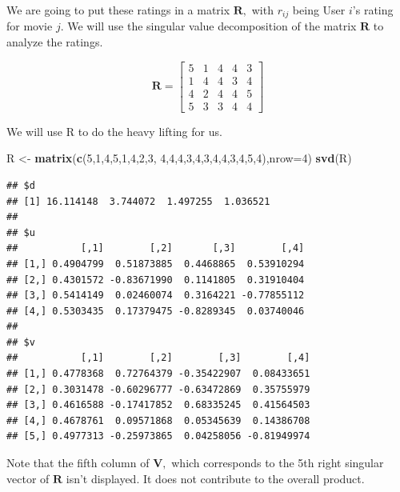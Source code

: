 \documentclass[
]{book}
\newenvironment{Shaded}{\begin{snugshade}}{\end{snugshade}}
\newcommand{\AttributeTok}[1]{\textcolor[rgb]{0.13,0.29,0.53}{#1}}
\newcommand{\DecValTok}[1]{\textcolor[rgb]{0.00,0.00,0.81}{#1}}
\newcommand{\FunctionTok}[1]{\textcolor[rgb]{0.13,0.29,0.53}{\textbf{#1}}}
\newcommand{\NormalTok}[1]{#1}
\newcommand{\OtherTok}[1]{\textcolor[rgb]{0.56,0.35,0.01}{#1}}
\theoremstyle{definition}
\theoremstyle{definition}
\theoremstyle{definition}
\theoremstyle{definition}
\theoremstyle{remark}
\begin{document}
We are going to put these ratings in a matrix \(\mathbf{R},\) with \(r_{ij}\) being User \(i\)'s rating for movie \(j.\) We will use the singular value decomposition of the matrix \(\mathbf{R}\) to analyze the ratings.

\[\mathbf{R}=\begin{bmatrix}5&1&4&4&3\\1&4&4&3&4\\4&2&4&4&5\\5&3&3&4&4\end{bmatrix}\]

We will use R to do the heavy lifting for us.

\begin{Shaded}
\begin{Highlighting}[]
\NormalTok{R }\OtherTok{\textless{}{-}} \FunctionTok{matrix}\NormalTok{(}\FunctionTok{c}\NormalTok{(}\DecValTok{5}\NormalTok{,}\DecValTok{1}\NormalTok{,}\DecValTok{4}\NormalTok{,}\DecValTok{5}\NormalTok{,}\DecValTok{1}\NormalTok{,}\DecValTok{4}\NormalTok{,}\DecValTok{2}\NormalTok{,}\DecValTok{3}\NormalTok{,  }
      \DecValTok{4}\NormalTok{,}\DecValTok{4}\NormalTok{,}\DecValTok{4}\NormalTok{,}\DecValTok{3}\NormalTok{,}\DecValTok{4}\NormalTok{,}\DecValTok{3}\NormalTok{,}\DecValTok{4}\NormalTok{,}\DecValTok{4}\NormalTok{,}\DecValTok{3}\NormalTok{,}\DecValTok{4}\NormalTok{,}\DecValTok{5}\NormalTok{,}\DecValTok{4}\NormalTok{),}\AttributeTok{nrow=}\DecValTok{4}\NormalTok{)}
\FunctionTok{svd}\NormalTok{(R)}
\end{Highlighting}
\end{Shaded}

\begin{verbatim}
## $d
## [1] 16.114148  3.744072  1.497255  1.036521
## 
## $u
##           [,1]        [,2]       [,3]        [,4]
## [1,] 0.4904799  0.51873885  0.4468865  0.53910294
## [2,] 0.4301572 -0.83671990  0.1141805  0.31910404
## [3,] 0.5414149  0.02460074  0.3164221 -0.77855112
## [4,] 0.5303435  0.17379475 -0.8289345  0.03740046
## 
## $v
##           [,1]        [,2]        [,3]        [,4]
## [1,] 0.4778368  0.72764379 -0.35422907  0.08433651
## [2,] 0.3031478 -0.60296777 -0.63472869  0.35755979
## [3,] 0.4616588 -0.17417852  0.68335245  0.41564503
## [4,] 0.4678761  0.09571868  0.05345639  0.14386708
## [5,] 0.4977313 -0.25973865  0.04258056 -0.81949974
\end{verbatim}

Note that the fifth column of \(\mathbf{V},\) which corresponds to the 5th right singular vector of \(\mathbf{R}\) isn't displayed. It does not contribute to the overall product.
\end{document}
